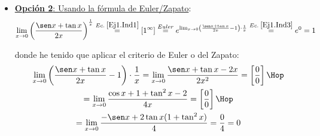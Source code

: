 \documentclass[12pt]{article}
\begin{document}
\begin{ejercicio}
\begin{itemize}
        \item \underline{\textbf{Opción 2}: Usando la fórmula de Euler/Zapato}:
        \begin{equation*}
            \lim_{x\to 0}\left(\frac{\sen x +\tan x}{2x}\right) ^\frac{1}{x} \stackrel{Ec.\;\ref{Ej1.Ind1}}{=} [1^\infty] \stackrel{Euler}{=} e^{\lim_{x\to 0} \left(\frac{\sen x +\tan x}{2x} -1\right)\cdot \frac{1}{x}} \stackrel{Ec.\;\ref{Ej1.Ind3}}{=} e^0 = 1
        \end{equation*}
    
        donde he tenido que aplicar el criterio de Euler o del Zapato:
        \begin{multline}\label{Ej1.Ind3}
            \lim_{x\to 0} \left(\frac{\sen x +\tan x}{2x} -1\right)\cdot \frac{1}{x}
            = \lim_{x\to 0} \frac{\sen x +\tan x -2x}{2x^2}
            = \left[\frac{0}{0}\right]
            \Hop\\=
            \lim_{x\to 0} \frac{\cos x +1+\tan^2 x -2}{4x}
            = \left[\frac{0}{0}\right]
            \Hop\\=
            \lim_{x\to 0} \frac{-\sen x +2\tan x(1+\tan^2 x)}{4} =\frac{0}{4}= 0
        \end{multline}
    \end{itemize}

    
\end{ejercicio}
\end{document}
